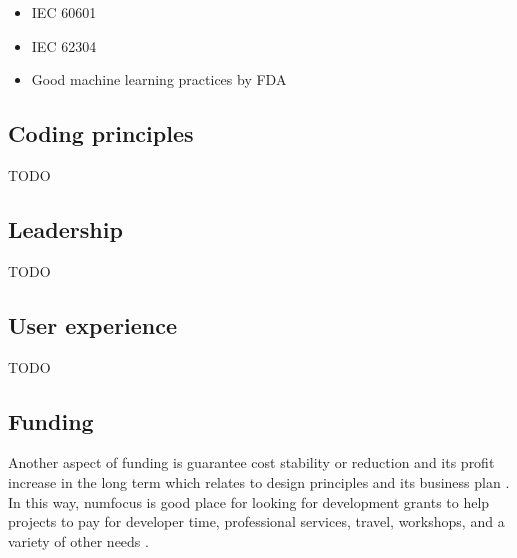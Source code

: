 \documentclass{article}
\begin{document}
\begin{itemize}
\item IEC 60601 
\item IEC 62304
\item Good machine learning practices by FDA
\end{itemize}

\subsection{Coding principles}
TODO






\subsection{Leadership}
TODO


\subsection{User experience}
TODO


\subsection{Funding}
Another aspect of funding is guarantee cost stability or reduction and its profit increase in the long term which relates to design principles and its business plan \cite{imran2019software}. In this way, numfocus is good place for looking for development grants to help projects to pay for developer time, professional services, travel, workshops, and a variety of other needs \cite{numfocus}.

\end{document}
